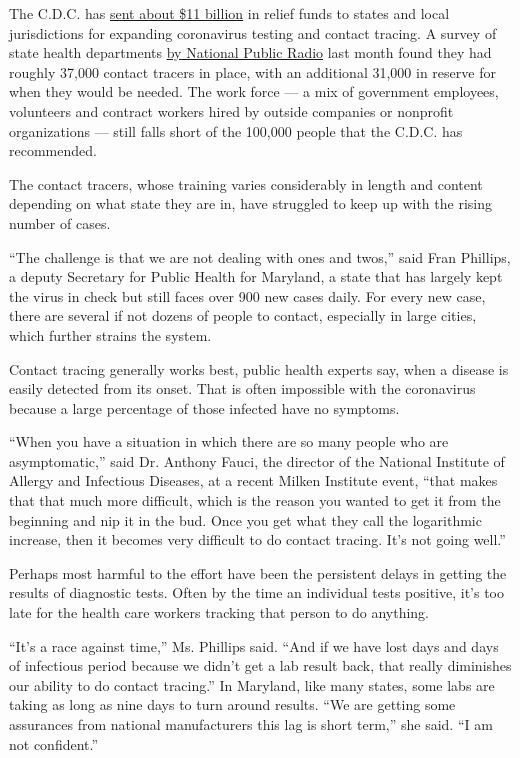 The C.D.C. has
\href{https://www.hhs.gov/about/news/2020/05/18/hhs-delivers-funding-to-expand-testing-capacity-for-states-territories-tribes.html}{sent
about \$11 billion} in relief funds to states and local jurisdictions
for expanding coronavirus testing and contact tracing. A survey of state
health departments
\href{https://www.npr.org/sections/health-shots/2020/06/18/879787448/as-states-reopen-do-they-have-the-workforce-they-need-to-stop-coronavirus-outbre}{by
National Public Radio} last month found they had roughly 37,000 contact
tracers in place, with an additional 31,000 in reserve for when they
would be needed. The work force --- a mix of government employees,
volunteers and contract workers hired by outside companies or nonprofit
organizations --- still falls short of the 100,000 people that the
C.D.C. has recommended.

The contact tracers, whose training varies considerably in length and
content depending on what state they are in, have struggled to keep up
with the rising number of cases.

``The challenge is that we are not dealing with ones and twos,'' said
Fran Phillips, a deputy Secretary for Public Health for Maryland, a
state that has largely kept the virus in check but still faces over 900
new cases daily. For every new case, there are several if not dozens of
people to contact, especially in large cities, which further strains the
system.

Contact tracing generally works best, public health experts say, when a
disease is easily detected from its onset. That is often impossible with
the coronavirus because a large percentage of those infected have no
symptoms.

``When you have a situation in which there are so many people who are
asymptomatic,'' said Dr. Anthony Fauci, the director of the National
Institute of Allergy and Infectious Diseases, at a recent Milken
Institute event, ``that makes that that much more difficult, which is
the reason you wanted to get it from the beginning and nip it in the
bud. Once you get what they call the logarithmic increase, then it
becomes very difficult to do contact tracing. It's not going well.''

Perhaps most harmful to the effort have been the persistent delays in
getting the results of diagnostic tests. Often by the time an individual
tests positive, it's too late for the health care workers tracking that
person to do anything.

``It's a race against time,'' Ms. Phillips said. ``And if we have lost
days and days of infectious period because we didn't get a lab result
back, that really diminishes our ability to do contact tracing.'' In
Maryland, like many states, some labs are taking as long as nine days to
turn around results. ``We are getting some assurances from national
manufacturers this lag is short term,'' she said. ``I am not
confident.''

